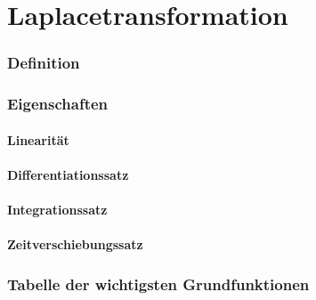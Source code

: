 



\chapter{Laplacetransformation}


\subsection{Definition}


\subsection{Eigenschaften }


\subsubsection{Linearität}


\subsubsection{Differentiationssatz}


\subsubsection{Integrationssatz}


\subsubsection{Zeitverschiebungssatz}


\subsection{Tabelle der wichtigsten Grundfunktionen}


